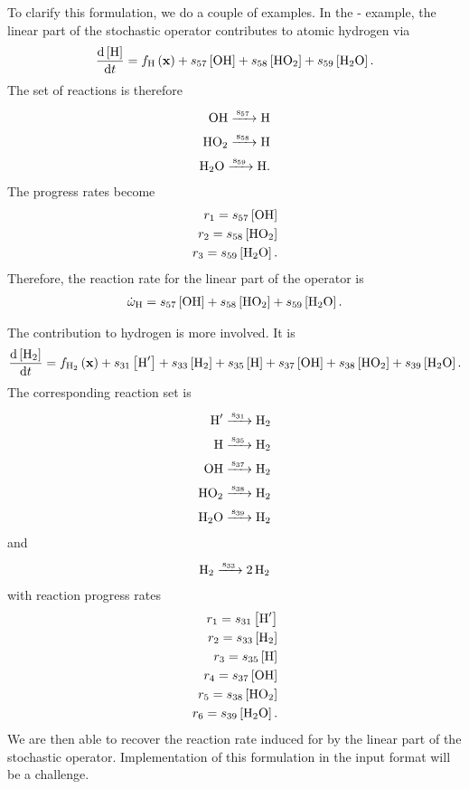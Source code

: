 To clarify this formulation, we do a couple of examples.  In the - example, the linear part of the stochastic operator contributes to atomic hydrogen via
\begin{align}
  \odeone{\left[\ce{H}\right]}{t} = f_{\ce{H}}\lr{\mathbf{x}} + s_{57}\left[\ce{OH}\right] + s_{58}\left[\ce{HO2}\right] + s_{59}\left[\ce{H2O}\right].
\end{align}
The set of reactions is therefore
\begin{align}
  \ce{OH ->[s_{57}] H} \\
  \ce{HO2 ->[s_{58}] H} \\
  \ce{H2O ->[s_{59}] H}.
\end{align}
The progress rates become
\begin{align}
  r_{1} = s_{57}\left[\ce{OH}\right] \\
  r_{2} = s_{58}\left[\ce{HO2}\right] \\
  r_{3} = s_{59}\left[\ce{H2O}\right]. 
\end{align}
Therefore, the reaction rate for the linear part of the operator is
\begin{align}
  \dot{\omega}_{\ce{H}} = s_{57}\left[\ce{OH}\right] + s_{58}\left[\ce{HO2}\right] + s_{59}\left[\ce{H2O}\right].
\end{align}

The contribution to hydrogen is more involved.  It is
\begin{align}
  \odeone{\left[\ce{H2}\right]}{t} = f_{\ce{H2}}\lr{\mathbf{x}} + s_{31}\left[\ce{H^{\prime}}\right] + s_{33}\left[\ce{H2}\right] + s_{35}\left[\ce{H}\right] + s_{37}\left[\ce{OH}\right] + s_{38}\left[\ce{HO2}\right] + s_{39}\left[\ce{H2O}\right].
\end{align}
The corresponding reaction set is
\begin{align}
  \ce{H^{\prime} ->[s_{31}] \ce{H2}} \\
  \ce{H          ->[s_{35}] \ce{H2}} \\
  \ce{OH         ->[s_{37}] \ce{H2}} \\
  \ce{HO2        ->[s_{38}] \ce{H2}} \\
  \ce{H2O        ->[s_{39}] \ce{H2}}
\end{align}
and
\begin{align}
  \ce{H2 ->[s_{33}] \ce{2H2}}
\end{align}
with reaction progress rates
\begin{align}
  r_{1} = s_{31}\left[\ce{H^{\prime}}\right] \\
  r_{2} = s_{33}\left[\ce{H2}\right] \\
  r_{3} = s_{35}\left[\ce{H}\right] \\
  r_{4} = s_{37}\left[\ce{OH}\right] \\
  r_{5} = s_{38}\left[\ce{HO2}\right] \\
  r_{6} = s_{39}\left[\ce{H2O}\right].
\end{align}
We are then able to recover the reaction rate induced for  by the linear part of the stochastic operator.  Implementation of this formulation in the  input format will be a challenge.
